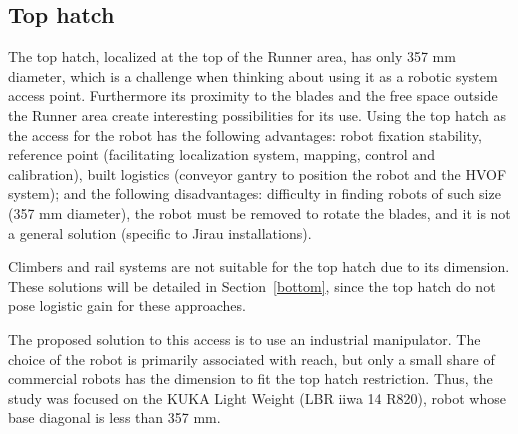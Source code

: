 \subsection{Top hatch}
The top hatch, localized at the top of the Runner area, has only 357 mm
diameter, which is a challenge when thinking about using it as a robotic system access
point. Furthermore its proximity to the blades and the free space outside the
Runner area create interesting possibilities for its use. Using the top hatch as
the access for the robot has the following advantages: robot fixation stability,
reference point (facilitating localization system, mapping, control and
calibration), built logistics (conveyor gantry to position the robot and the
HVOF system); and the following disadvantages: difficulty in finding robots of
such size (357 mm diameter), the robot must be removed to rotate the blades, and
it is not a general solution (specific to Jirau installations).



Climbers and rail systems are not suitable for the top hatch due to
its dimension. These solutions will be detailed in Section~\ref{bottom}, since
the top hatch do not pose logistic gain for these approaches.

The proposed solution to this access is to use an industrial
manipulator. The choice of the robot is primarily associated with reach, but
only a small share of commercial robots has the dimension to fit the top hatch restriction.
Thus, the study was focused on the KUKA Light Weight (LBR iiwa 14 R820), robot whose base
diagonal is less than 357 mm.

